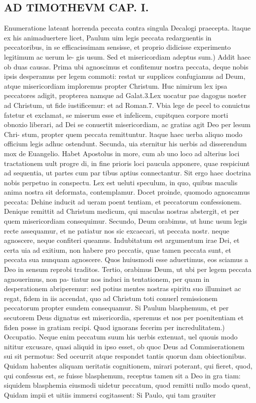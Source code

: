 \documentclass{article}
\begin{document}
\begin{pages}
\section*{AD TIMOTHEVM CAP. I. }
\marginpar{[ p.34 ]}\pstart Enumeratione lateant horrenda peccata contra singula Decalogi praecepta. ltaque  ex his animaduertere licet, Paulum uim legis peccata redarguentis in peccatoribus, in se efficacissimam sensisse, et proprio didicisse experimento legitimum ac uerum le- gis usum.  \pend\pstart Sed et misericordiam adeptus sum.) Addit haec ob duas causas. Prima ubi agnoscimus et confitemur nostra peccata, deque  nobis ipsis desperamus per legem commoti: restat ur supplices confugiamus ad Deum, atque  misericordiam imploremus propter Christum. Huc nimirum lex ipsa peccatores adigit, propterea namque  ad Galat.3.Lex uocatur pae dagogus noster ad Christum, ut fide iustificemur: et ad Roman.7. Vbia lege de pecel to conuictus fatetur et exclamat, se miserum esse et infelicem, cupitquea corpore morti obnoxio liberari, ad Dei se conuertit misericordiam, ac gratias agit Deo per lesum Chri- stum, propter quem peccata remittuntur. ltaque  haec uerba aliquo modo officium legis adhuc ostendunt. Secunda, uia sternitur his uerbis ad disserendum mox de Euangelio. Habet Apostolus in more, cum ab uno loco ad alterius loci tractationem uult progre di, in fine prioris loci paucula apponere, quae respiciunt ad sequentia, ut partes cum par tibus aptius connectantur. Sit ergo haec doctrina nobis perpetuo in conspectu. Lex est ueluti speculum, in quo, quibus maculis anima nostra sit deformata, contemplamur.  \pend\pstart Docet proinde, quomodo agnoscamus peccata: Dehine inducit ad ueram poent tentiam, et peccatorum confessionem. Denique  remittit ad Christum medicum, qui maculas nostras abstergit, et per quem misericordiam consequimur. Secundo, Deum orabimus, ut hunc usum legis recte assequamur, et ne patiatur nos sic excaecari, ut peccata nostr. neque  agnoscere, neque  confiteri queamus. Indubitatum est argumentum irae Dei, et certa uia ad exitium, non habere pro peccatis, quae tamen peccata sunt, et peccata sua nunquam agnoscere. Quos huiusmodi esse aduertimus, eos sciamus a Deo in sensum reprobi traditos. Tertio, orabimus Deum, ut ubi per legem peccata agnouerimus, non pa- tiatur nos induci in tentationem, per quam in desperationem abriperemur: sed potius mentes nostras spiritu suo illuminet ac regat, fidem in iis accendat, quo ad Christum toti conuerl remissionem peccatorum propter eundem consequamur. Si Paulum blasphemum, et per secutorem Deus dignatus est misericordia, speremus et nos per poenitentiam et fiden posse in gratiam recipi.  \pend\pstart Quod ignorans fecerim per incredulitatem.) Occupatio. Neque  enim peccatum suum his uerbis extenuat, uel quouis modo nititur excusare, quasi aliquid in ipso esset, ob quoc Deus ad Commiserationem sui sit permotus: Sed oceurrit atque  respondet tantis quorun dam obiectionibus. Quidam habentes aliquam ueritatis cognitionem, mirari poterant, qui fieret, quod, qui confessus est, se fuisse blasphemum, receptus tamen sit a Deo in gra tiam: siquidem blasphemia eiusmodi uidetur peccatum, quod remitti nullo modo queat, Quidam impii et uitiis immersi cogitassent: Si Paulo, qui tam grauiter 
\end{pages}
\end{document}
